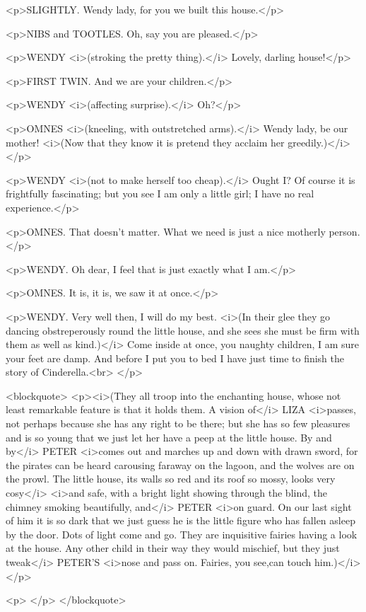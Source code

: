 <p>SLIGHTLY. Wendy lady, for you we built this house.</p>

<p>NIBS and TOOTLES. Oh, say you are pleased.</p>

<p>WENDY <i>(stroking the pretty thing).</i> Lovely, darling
house!</p>

<p>FIRST TWIN. And we are your children.</p>

<p>WENDY <i>(affecting surprise).</i> Oh?</p>

<p>OMNES <i>(kneeling, with outstretched arms).</i> Wendy lady, be
our mother! <i>(Now that they know it is pretend they acclaim her
greedily.)</i></p>

<p>WENDY <i>(not to make herself too cheap).</i> Ought I? Of course
it is frightfully fascinating; but you see I am only a little girl; I
have no real experience.</p>

<p>OMNES. That doesn't matter. What we need is just a nice motherly
person.</p>

<p>WENDY. Oh dear, I feel that is just exactly what I am.</p>

<p>OMNES. It is, it is, we saw it at once.</p>

<p>WENDY. Very well then, I will do my best. <i>(In their glee they
go dancing obstreperously round the little house, and she sees she
must be firm with them as well as kind.)</i> Come inside at once, you
naughty children, I am sure your feet are damp. And before I put you
to bed I have just time to finish the story of Cinderella.<br>
</p>

<blockquote>
<p><i>(They all troop into the enchanting house, whose not least
remarkable feature is that it holds them. A vision of</i> LIZA
<i>passes, not perhaps because she has any right to be there; but she
has so few pleasures and is so young that we just let her have a peep
at the little house. By and by</i> PETER <i>comes out and marches up
and down with drawn sword, for the pirates can be heard carousing
faraway on the lagoon, and the wolves are on the prowl. The little
house, its walls so red and its roof so mossy, looks very cosy</i>
<i>and safe, with a bright light showing through the blind, the
chimney smoking beautifully, and</i> PETER <i>on guard. On our last
sight of him it is so dark that we just guess he is the little figure
who has fallen asleep by the door. Dots of light come and go. They
are inquisitive fairies having a look at the house. Any other child
in their way they would mischief, but they just tweak</i> PETER'S
<i>nose and pass on. Fairies, you see,can touch him.)</i></p>

<p> </p>
</blockquote>

